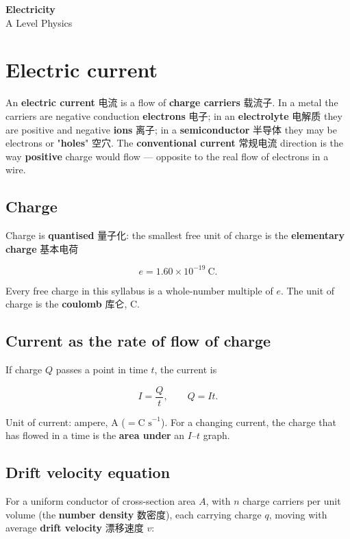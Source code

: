 \documentclass[11pt]{article}
\begin{document}
\begin{center}
  {\LARGE\bfseries Electricity}\\[0.35em]
  {\large A Level Physics}
\end{center}
\vspace{0.6em}

\section*{Electric current}

An \textbf{electric current} 电流 is a flow of \textbf{charge carriers} 载流子. In a metal the carriers are negative conduction \textbf{electrons} 电子; in an \textbf{electrolyte} 电解质 they are positive and negative \textbf{ions} 离子; in a \textbf{semiconductor} 半导体 they may be electrons or "\textbf{holes}" 空穴. The \textbf{conventional current} 常规电流 direction is the way \textbf{positive} charge would flow — opposite to the real flow of electrons in a wire.

\subsection*{Charge}

Charge is \textbf{quantised} 量子化: the smallest free unit of charge is the \textbf{elementary charge} 基本电荷

\[
e = 1.60 \times 10^{-19}\ \text{C}.
\]

Every free charge in this syllabus is a whole-number multiple of $e$. The unit of charge is the \textbf{coulomb} 库仑, $\text{C}$.

\subsection*{Current as the rate of flow of charge}

If charge $Q$ passes a point in time $t$, the current is

\[
I = \frac{Q}{t}, \qquad Q = It.
\]

Unit of current: ampere, $\text{A}$ ($= \text{C s}^{-1}$). For a changing current, the charge that has flowed in a time is the \textbf{area under} an $I$–$t$ graph.

\subsection*{Drift velocity equation}

For a uniform conductor of cross-section area $A$, with $n$ charge carriers per unit volume (the \textbf{number density} 数密度), each carrying charge $q$, moving with average \textbf{drift velocity} 漂移速度 $v$:
\end{document}
